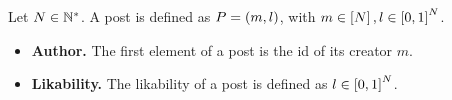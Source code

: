 \begin{definition}[Post]
  Let $N \in \mathbb{N}^*$. A post is defined as $P = \left(m,
  l\right)$, with $m \in \left[N\right], l \in \left[0,
  1\right]^N$.
  \begin{itemize}
    \item \textbf{Author.} The first element of a post is the id of its creator
    $m$.

    \item \textbf{Likability.} The likability of a post is defined as $l \in
    \left[0, 1\right]^N$.
  \end{itemize}
\end{definition}
